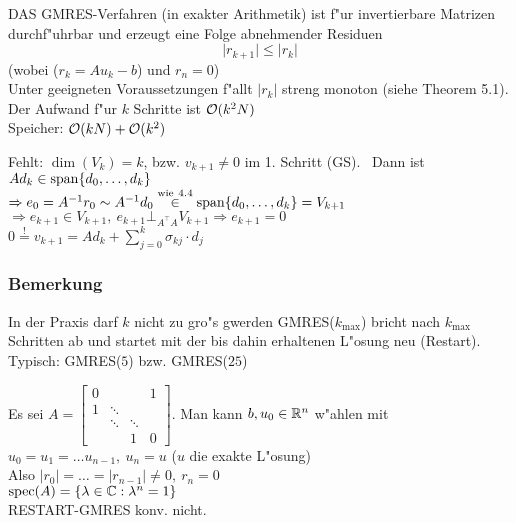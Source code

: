 \documentclass{scrartcl}
\begin{document}
\begin{Satz}
DAS GMRES-Verfahren (in exakter Arithmetik) ist f"ur invertierbare Matrizen durchf"uhrbar und erzeugt eine Folge abnehmender Residuen
$$\vert r_{k+1} \vert \leq \vert r_k \vert$$
(wobei ($r_k = Au_k - b $) und $r_n = 0$) \\
Unter geeigneten Voraussetzungen f"allt $\vert r_k \vert$ streng monoton (siehe Theorem 5.1). \\
Der Aufwand f"ur $k$ Schritte ist $\mathcal{O} (k^2 N)$ \\
Speicher: $\mathcal{O}(kN) + \mathcal{O}(k^2)$
\end{Satz}
\begin{Bew}
Fehlt: $\dim(V_k) = k$, bzw. $v_{k+1} \neq 0$ im 1. Schritt (GS). \
Dann ist $A d_k \in \mathrm{span} \{ d_0 , \ldots, d_k \}$ \\
$\Rightarrow e_0 = A^{-1} r_0 \sim A^{-1} d_0 \stackrel{\mathrm{wie \ 4.4} }{\in} \mathrm{span} \{ d_0, \ldots, d_k \} = V_{k+1}$\\
$\Rightarrow e_{k+1} \in V_{k+1}, \ e_{k+1} \bot_{A^\top A} V_{k+1} \Rightarrow e_{k+1} = 0$ \\
$0 \stackrel{!}{=} v_{k+1} = Ad_k + \sum\limits_{j=0}^k \sigma_{kj} \cdot d_j$
\end{Bew}

\subsubsection*{Bemerkung}
\begin{1aufz} 
\item In der Praxis darf $k$ nicht zu gro"s gwerden GMRES($k_\mathrm{max}$) bricht nach $k_\mathrm{max}$ Schritten ab und startet mit der bis dahin erhaltenen L"osung neu (Restart). Typisch: GMRES($5$) bzw. GMRES($25$)
\item Es sei $A = \left[ \begin{smallmatrix} 0 & & & 1 \\ 1 & \ddots \\ & \ddots & \ddots \\ & & 1 &0 \end{smallmatrix} \right]$. Man kann $b, u_0 \in \mathbb{R}^n$ w"ahlen mit $u_0 = u_1 = \ldots u_{n-1}, \ u_n = u$ ($u$ die exakte L"osung) \\
Also $\vert r_0 \vert = \ldots = \vert r_{n-1} \vert \neq 0, \ r_n = 0$ \\
$\mathrm{spec}(A) = \{ \lambda \in \mathbb{C}: \lambda^n = 1 \}$ \\
RESTART-GMRES konv. nicht.
\end{1aufz}
\end{document}
